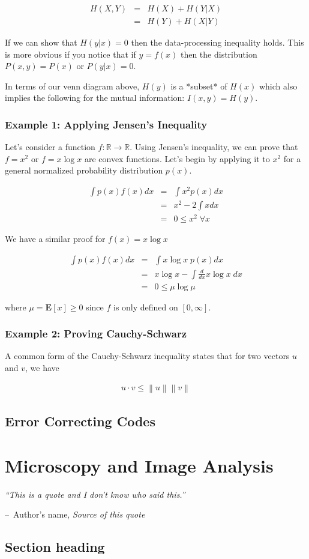 \documentclass[a4paper,11pt]{book}
\makeatletter
\newenvironment{chapquote}[2][2em]
  {\setlength{\@tempdima}{#1}%
   \def\chapquote@author{#2}%
   \parshape 1 \@tempdima \dimexpr\textwidth-2\@tempdima\relax%
   \itshape}
  {\par\normalfont\hfill--\ \chapquote@author\hspace*{\@tempdima}\par\bigskip}
\makeatother
\begin{document}
\begin{eqnarray}
H(X,Y) &=& H(X) + H(Y|X)\\
&=& H(Y) + H(X|Y)
\end{eqnarray}

If we can show that $H(y|x) = 0$ then the data-processing inequality holds. This is more obvious if you notice that if $y = f(x)$ then the distribution $P(x,y) = P(x)$ or $P(y|x) = 0$. 

In terms of our venn diagram above, $H(y)$ is a *subset* of $H(x)$ which also implies the following for the mutual information: $I(x,y) = H(y)$. 

\subsection{Example 1: Applying Jensen's Inequality}

Let's consider a function $f: \mathbb{R} \rightarrow \mathbb{R}$. Using Jensen's inequality, we can prove that $f=x^{2}$ or $f=x\log x$ are convex functions. Let's begin by applying it to $x^{2}$ for a general normalized probability distribution $p(x)$.

\begin{eqnarray*}
\int p(x)f(x)dx & = & \int x^{2}p(x)dx\\
&=& x^{2} - 2\int xdx\\
&=& 0 \leq x^{2} \; \forall x
\end{eqnarray*}

We have a similar proof for $f(x) = x\log x$

\begin{eqnarray*}
\int p(x)f(x)dx & = & \int x\log x\; p(x)dx\\
&=& x\log x - \int \frac{d}{dx}x\log x\;dx\\
&=& 0 \leq \mu \log \mu
\end{eqnarray*}

where $\mu = \mathbf{E}[x] \geq 0$ since $f$ is only defined on $[0, \infty]$.

\subsection{Example 2: Proving Cauchy-Schwarz}

A common form of the Cauchy-Schwarz inequality states that for two vectors $u$ and $v$, we have

\newcommand\norm[1]{\left\lVert#1\right\rVert}
\begin{eqnarray*}
u \cdot v  \leq \norm{u}\norm{v}
\end{eqnarray*}

\section{Error Correcting Codes}

\chapter{Microscopy and Image Analysis}

\begin{chapquote}{Author's name, \textit{Source of this quote}}
``This is a quote and I don't know who said this.''
\end{chapquote}

\section{Section heading}
\end{document}
